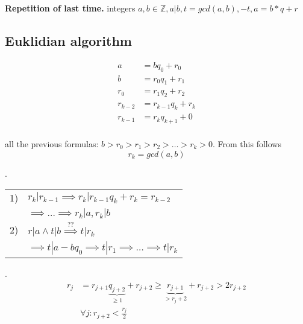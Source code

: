 

\textbf{Repetition of last time.}
integers $a,b \in \mathbb{Z}, a|b, t = gcd(a,b), -t, a = b*q + r$

\subsection{Euklidian algorithm}
\begin{align*}
  a &= b q_0 +r_0 \\
  b &= r_0 q_1 + r_1 \\
  r_0 &= r_1 q_2 + r_2\\
  r_{k-2} &= r_{k-1}  q_k + r_k \\
  r_{k-1} &= r_{k}  q_{k+1} + 0 \\
\end{align*}

all the previous formulas: $ b > r_0 > r_1 > r_2 > \ldots > r_k > 0$. From this follows
\[
  r_k = gcd(a,b)
\]

\Proof. \\
\begin{tabular}{ll}
  1) & $r_k | r_{k-1} \implies r_k | r_{k-1} q_k + r_k = r_{k-2}$ \\
     & $\implies \ldots \implies r_k | a, r_k | b$ \\
  2) & $r | a \wedge t | b \stackrel{\text{??}}{\implies} t| r_k$ \\
     & $\implies t | a-bq_0 \implies t | r_1 \implies \ldots \implies t|r_k$
\end{tabular}


\Remark.
\begin{align*}
  r_j &= r_{j + 1} \underbrace{q_{j+2}}_{ \geq 1} + r_{j+2} \geq \underbrace{r_{j+1}}_{ > r_j+2} + r_{j+2} > 2 r_{j+2} \\
      & \forall j: r_{j+2} < \frac{r_j}{2}
\end{align*}


